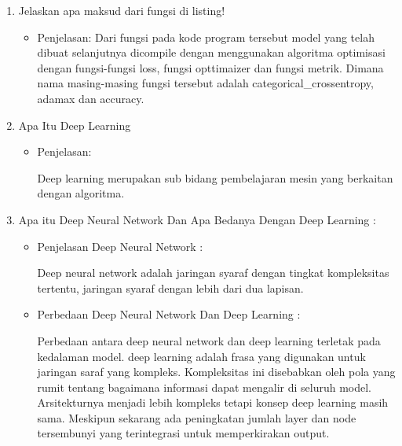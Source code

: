 \begin{enumerate}
\item Jelaskan apa maksud dari fungsi di listing!

\begin{itemize}
\item Penjelasan: Dari fungsi pada kode program tersebut model yang telah dibuat selanjutnya dicompile dengan menggunakan algoritma optimisasi dengan fungsi-fungsi loss, fungsi opttimaizer dan fungsi metrik. Dimana nama masing-masing fungsi tersebut adalah categorical\_crossentropy, adamax dan accuracy.
\par 
\end{itemize}
\par
\par

\item 	Apa Itu Deep Learning
\begin{itemize}
\item Penjelasan: 
\par  Deep learning merupakan sub bidang pembelajaran mesin yang berkaitan dengan algoritma.
\end{itemize}
\par
\par

\item Apa itu Deep Neural Network Dan Apa Bedanya Dengan Deep Learning :
\begin{itemize}
\item Penjelasan Deep Neural Network : 
\par  Deep neural network adalah jaringan syaraf dengan tingkat kompleksitas tertentu, jaringan syaraf dengan lebih dari dua lapisan.
\par
\item Perbedaan Deep Neural Network Dan Deep Learning :
\par  Perbedaan antara deep neural network dan deep learning terletak pada kedalaman model. deep learning adalah frasa yang digunakan untuk jaringan saraf yang kompleks. Kompleksitas ini disebabkan oleh pola yang rumit tentang bagaimana informasi dapat mengalir di seluruh model. Arsitekturnya menjadi lebih kompleks tetapi konsep deep learning masih sama. Meskipun sekarang ada peningkatan jumlah layer dan node tersembunyi yang terintegrasi untuk memperkirakan output.
\end{itemize}
\par
\par


\end{enumerate}
